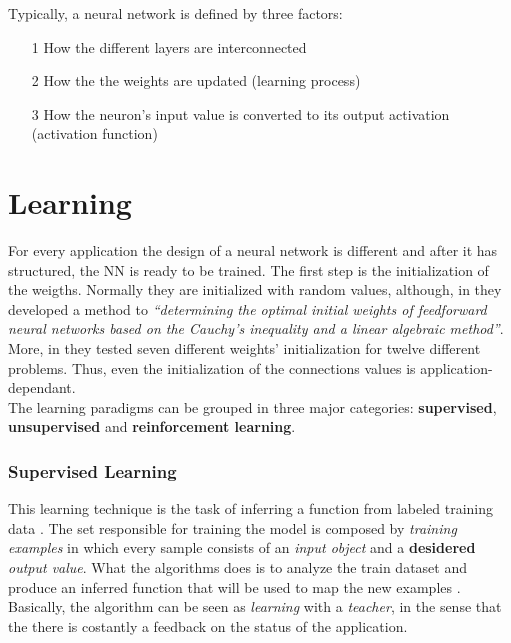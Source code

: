 \vspace*{0.33in}

\noindent Typically, a neural network is defined by three factors:
\begin{itemize}
    \item[1] How the different layers are interconnected
    \item[2] How the the weights are updated (learning process)
    \item[3] How the neuron's input value is converted to its output activation (activation function)
\end{itemize}

\section{Learning}
For every application the design of a neural network is different and after it has structured, the NN is ready to be trained. The first step is the initialization of the weigths. Normally they are initialized with random values, although, in \cite{yam2000weight} they developed a method to \textit{``determining the optimal initial weights of feedforward neural networks based on the Cauchy's inequality and a linear algebraic method''}. More, in \cite{fernandez2001weight} they tested seven different weights' initialization for twelve different problems. Thus, even the initialization of the connections values is application-dependant. \\
\noindent The learning paradigms can be grouped in three major categories: \textbf{supervised}, \textbf{unsupervised} and \textbf{reinforcement learning}.

\subsubsection{Supervised Learning}
This learning technique is the task of inferring a function from labeled training data \cite{sup_learn_wiki} \cite{mohri2012foundations}. The set responsible for training the model is composed by \textit{training examples} in which every sample consists of an \textit{input object} and a \textbf{desidered} \textit{output value}. What the algorithms does is to analyze the train dataset and produce an inferred function that will be used to map the new examples \cite{sup_learn_wiki}. Basically, the algorithm can be seen as \textit{learning} with a \textit{teacher}, in the sense that the there is costantly a feedback on the status of the application.

